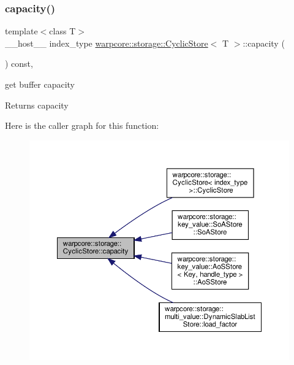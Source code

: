 \subsubsection{\texorpdfstring{capacity()}{capacity()}}
{\footnotesize\ttfamily template$<$class T$>$ \\
\+\_\+\+\_\+host\+\_\+\+\_\+ index\+\_\+type \hyperlink{classwarpcore_1_1storage_1_1CyclicStore}{warpcore\+::storage\+::\+Cyclic\+Store}$<$ T $>$\+::capacity (\begin{DoxyParamCaption}{ }\end{DoxyParamCaption}) const\hspace{0.3cm}{\ttfamily [inline]}, {\ttfamily [noexcept]}}



get buffer capacity 

\begin{DoxyReturn}{Returns}
capacity 
\end{DoxyReturn}
Here is the caller graph for this function\+:
\nopagebreak
\begin{figure}[H]
\begin{center}
\leavevmode
\includegraphics[width=350pt]{classwarpcore_1_1storage_1_1CyclicStore_acc4bfbb9b10868a193301d0ec5a46711_icgraph}
\end{center}
\end{figure}
\mbox{\label{classwarpcore_1_1storage_1_1CyclicStore_afa6513c27f8e27b256b45d992ba4c820}} 
